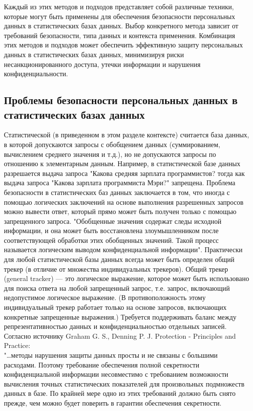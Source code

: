Каждый из этих методов и подходов представляет собой различные техники, которые могут быть применены для обеспечения безопасности персональных данных в статистических базах данных. Выбор конкретного метода зависит от требований безопасности, типа данных и контекста применения. Комбинация этих методов и подходов может обеспечить эффективную защиту персональных данных в статистических базах данных, минимизируя риски несанкционированного доступа, утечки информации и нарушения конфиденциальности.


\subsection{Проблемы безопасности персональных данных в статистических базах данных}

Статистической (в приведенном в этом разделе контексте) считается база данных, в которой допускаются запросы с обобщением данных (суммированием, вычислением среднего значения и т.д.), но не допускаются запросы по отношению к элементарным данным. Например, в статистической базе данных разрешается выдача запроса "Какова средняя зарплата программистов? тогда как выдача запроса "Какова зарплата программиста Мэри?" запрещена. Проблема безопасности в статистических баз данных заключается в том, что иногда с помощью логических заключений на основе выполнения разрешенных запросов можно вывести ответ, который прямо может быть получен только с помощью запрещенного запроса. "Обобщенные значения содержат следы исходной информации, и она может быть восстановлена злоумышленником после соответствующей обработки этих обобщенных значений. Такой процесс называется логическим выводом конфиденциальной информации". Практически для любой статистической базы данных всегда может быть определен общий трекер (в отличие от множества индивидуальных трекеров). Общий трекер (general tracker) — это логическое выражение, которое может быть использовано для поиска ответа на любой запрещенный запрос, т.е. запрос, включающий недопустимое логическое выражение. (В противоположность этому индивидуальный трекер работает только на основе запросов, включающих конкретные запрещенные выражения.) Требуется поддерживать баланс между репрезентативностью данных и конфиденциальностью отдельных записей. 
\\

Согласно источнику Graham G. S., Denning P. J. Protection - Principles and Practice:
\\

"…методы нарушения защиты данных просты и не связаны с большими расходами. Поэтому требование обеспечения полной секретности конфиденциальной информации несовместимо с требованием возможности вычисления точных статистических показателей для произвольных подмножеств данных в базе. По крайней мере одно из этих требований должно быть снято прежде, чем можно будет поверить в гарантии обеспечения секретности.
\\

